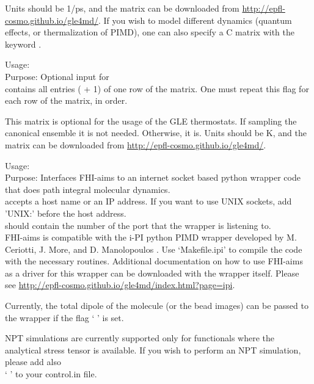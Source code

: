 Units should be 1/ps, and the matrix can be downloaded from \url{http://epfl-cosmo.github.io/gle4md/}.
If you wish to model different dynamics (quantum effects, or thermalization of PIMD), one can also
specify a C matrix with the keyword .

{\noindent
  Usage:   \\[1.0ex]
  Purpose: Optional input for  \\ [1.0ex]
   contains all entries ( + 1) of one row of the matrix. One must repeat this flag for each row of the matrix, in order.   
  \\[1.0em]
}

This matrix is optional for the usage of the GLE thermostats. If sampling the canonical ensemble it is not needed.
Otherwise, it is. Units should be K, and the matrix can be downloaded from \url{http://epfl-cosmo.github.io/gle4md/}.

{\noindent
  Usage:    \\[1.0em]
  Purpose: Interfaces FHI-aims to an internet socket based python wrapper code that does path integral molecular dynamics. \\[1.0ex]
   accepts a host name or an IP address. If you want to use UNIX sockets, add 'UNIX:' before the host address. \\[1.0ex]
   should contain the number of the port that the wrapper is listening to.
  \\[1.0em]
}
    FHI-aims is compatible with the i-PI python PIMD wrapper
    developed by M. Ceriotti, J. More, and D. Manolopoulos \cite{CeriottiMoreMano_2013}.
    Use `Makefile.ipi' to compile the code with the necessary routines.
    Additional documentation on how to use FHI-aims as a driver for this
    wrapper can be downloaded with the wrapper itself. Please see \url{http://epfl-cosmo.github.io/gle4md/index.html?page=ipi}.
   
    Currently, the total dipole of the molecule (or the bead images) can be passed to the wrapper 
    if the flag ` ' is set. 
    
    NPT simulations are currently supported only for functionals where
    the analytical stress tensor is available.
    If you wish to perform an NPT simulation, please add also \\
    ` ' 
    to your control.in file.

